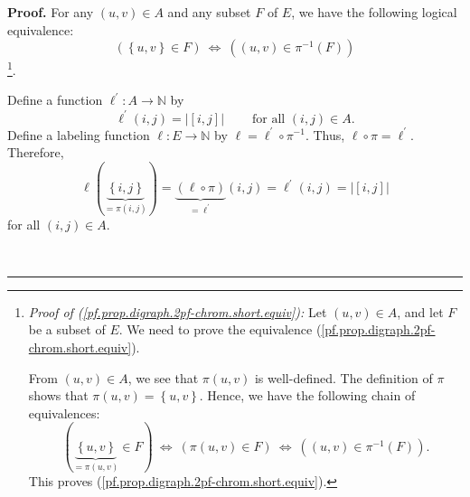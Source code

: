 \documentclass[numbers=enddot,12pt,final,onecolumn,notitlepage]{scrartcl}%
\theoremstyle{definition}
\newenvironment{proof}[1][Proof]{\noindent\textbf{#1.} }{\ \rule{0.5em}{0.5em}}
\newenvironment{vershort}{}{}
\begin{document}
\begin{vershort}
\begin{proof}
For any $\left(  u,v\right)  \in A$ and any subset $F$ of $E$, we have the
following logical equivalence:%
\begin{equation}
\left(  \left\{  u,v\right\}  \in F\right)  \ \Longleftrightarrow\ \left(
\left(  u,v\right)  \in\pi^{-1}\left(  F\right)  \right)
\label{pf.prop.digraph.2pf-chrom.short.equiv}%
\end{equation}
\footnote{\textit{Proof of (\ref{pf.prop.digraph.2pf-chrom.short.equiv}):} Let
$\left(  u,v\right)  \in A$, and let $F$ be a subset of $E$. We need to prove
the equivalence (\ref{pf.prop.digraph.2pf-chrom.short.equiv}).
\par
From $\left(  u,v\right)  \in A$, we see that $\pi\left(  u,v\right)  $ is
well-defined. The definition of $\pi$ shows that $\pi\left(  u,v\right)
=\left\{  u,v\right\}  $. Hence, we have the following chain of equivalences:%
\[
\left(  \underbrace{\left\{  u,v\right\}  }_{=\pi\left(  u,v\right)  }\in
F\right)  \ \Longleftrightarrow\ \left(  \pi\left(  u,v\right)  \in F\right)
\ \Longleftrightarrow\ \left(  \left(  u,v\right)  \in\pi^{-1}\left(
F\right)  \right)  .
\]
This proves (\ref{pf.prop.digraph.2pf-chrom.short.equiv}).}.

Define a function $\ell^{\prime}:A\rightarrow\mathbb{N}$ by%
\[
\ell^{\prime}\left(  i,j\right)  =\left\vert \left[  i,j\right]  \right\vert
\ \ \ \ \ \ \ \ \ \ \text{for all }\left(  i,j\right)  \in A.
\]
Define a labeling function $\ell:E\rightarrow\mathbb{N}$ by $\ell=\ell
^{\prime}\circ\pi^{-1}$. Thus, $\ell\circ\pi=\ell^{\prime}$. Therefore,%
\begin{equation}
\ell\left(  \underbrace{\left\{  i,j\right\}  }_{=\pi\left(  i,j\right)
}\right)  =\underbrace{\left(  \ell\circ\pi\right)  }_{=\ell^{\prime}}\left(
i,j\right)  =\ell^{\prime}\left(  i,j\right)  =\left\vert \left[  i,j\right]
\right\vert \label{pf.prop.digraph.2pf-chrom.short.l}%
\end{equation}
for all $\left(  i,j\right)  \in A$.


\end{proof}
\end{vershort}
\end{document}
